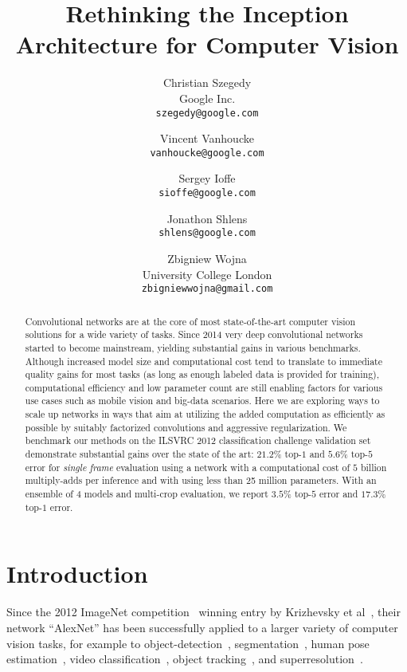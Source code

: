 \documentclass[10pt,twocolumn,letterpaper]{article}
\begin{document}
\title{Rethinking the Inception Architecture for Computer Vision}

\author{Christian Szegedy\\
Google Inc.\\
{\tt\small szegedy@google.com}
\and
Vincent Vanhoucke\\
{\tt\small vanhoucke@google.com}
\and
Sergey Ioffe\\
{\tt\small sioffe@google.com}
\and
Jonathon Shlens\\
{\tt\small shlens@google.com}
\and
Zbigniew Wojna\\
University College London\\
{\tt\small zbigniewwojna@gmail.com}
}


\maketitle


\begin{abstract}
Convolutional networks are at the core of most state-of-the-art
computer vision solutions for a wide variety of tasks.
Since 2014 very deep convolutional networks started to become
mainstream, yielding substantial gains in various benchmarks.
Although increased model size and computational cost tend to
translate to immediate quality gains for most tasks (as long as enough
labeled data is provided for training), computational efficiency and
low parameter count are still enabling factors for various use
cases such as mobile vision and big-data scenarios.
Here we are exploring ways to scale up networks in ways that aim at
utilizing the added computation as efficiently as possible by
suitably factorized convolutions and aggressive regularization.
We benchmark our methods on the ILSVRC 2012 classification challenge
validation set demonstrate substantial gains over the state of the art:
$21.2\%$ top-$1$ and $5.6\%$ top-$5$ error for {\it single frame}
evaluation using a network with a computational cost of $5$ billion
multiply-adds per inference and with using less than 25 million
parameters. With an ensemble of $4$ models and multi-crop
evaluation, we report $3.5\%$ top-$5$ error and $17.3\%$
top-$1$ error.
 \end{abstract}

\section{Introduction}

Since the 2012 ImageNet competition~\cite{russakovsky2014imagenet}
winning entry by Krizhevsky et al~\cite{krizhevsky2012imagenet},
their network ``AlexNet'' has been successfully applied to a larger variety of
computer vision tasks, for example to object-detection~\cite{girshick2014rcnn},
segmentation~\cite{long2015fully}, human pose estimation~\cite{toshev2014deeppose},
video classification~\cite{karpathy2014large}, object
tracking~\cite{wang2013learning}, and superresolution~\cite{dong2014learning}.
\end{document}
